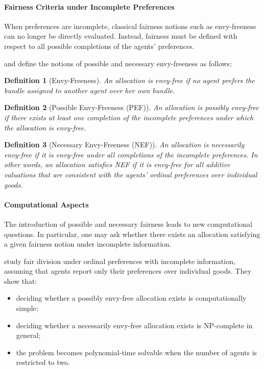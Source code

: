 \documentclass{article}
\newtheorem{definition}{Definition}
\begin{document}
\paragraph{Fairness Criteria under Incomplete Preferences} When preferences are incomplete, classical fairness notions such as envy-freeness can no longer be directly evaluated. 
Instead, fairness must be defined with respect to all possible completions of the agents' preferences.

\cite{bouveret2010fair} and \cite{aziz2024computational} define the notions of possible and necessary envy-freeness as follows:

\begin{definition}[Envy-Freeness]
An allocation is envy-free if no agent prefers the bundle assigned to another agent over her own bundle.
\end{definition}

\begin{definition}[Possible Envy-Freeness (PEF)]
An allocation is possibly envy-free if there exists at least one completion of the incomplete preferences under which the allocation is envy-free.
\end{definition}

\begin{definition}[Necessary Envy-Freeness (NEF)]
An allocation is necessarily envy-free if it is envy-free under all completions of the incomplete preferences.
In other words, an allocation satisfies NEF if it is envy-free for all additive valuations that are consistent with the agents' ordinal preferences over individual goods.
\end{definition}


\paragraph{Computational Aspects} The introduction of possible and necessary fairness leads to new computational questions. 
In particular, one may ask whether there exists an allocation satisfying a given fairness notion under incomplete information.

\cite{bouveret2010fair} study fair division under ordinal preferences with incomplete information, assuming that agents report only their preferences over individual goods. 
They show that:
\begin{itemize}
    \item deciding whether a possibly envy-free allocation exists is computationally simple;
    \item deciding whether a necessarily envy-free allocation exists is NP-complete in general;
    \item the problem becomes polynomial-time solvable when the number of agents is restricted to two.
\end{itemize}
\end{document}
